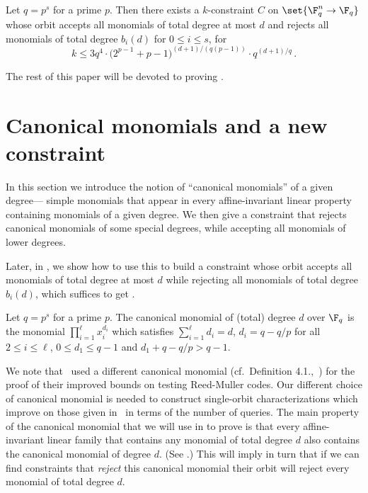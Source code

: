 \begin{theorem}\label{thm:main2}
Let $q=p^s$ for a prime $p$.
Then there exists a $k$-constraint $C$ on $\set{\F_q^n \to \F_q}$ whose orbit
accepts all monomials
of total degree at most $d$
and rejects all
monomials of total degree $b_i(d)$ for $0 \leq i \leq s$,
for \[k \leq 3q^4 \cdot \big(2^{p-1}+p-1\big)^{(d+1)/(q(p-1))} \cdot q^{(d+1)/q}\,.\]
\end{theorem}

The rest of this paper will be devoted to proving .


\section{Canonical monomials and a new constraint}
\label{sec:main}

In this section we introduce the notion of ``canonical monomials''
of a given degree---%
simple %
monomials that appear in every affine-invariant
linear property containing monomials of a given degree.
We then give a constraint that rejects canonical monomials of
some special degrees, while accepting all monomials of lower degrees.

Later, in , we show how to use this to build
a constraint whose orbit accepts all monomials of total degree at most $d$ while rejecting
all monomials of total degree $b_i(d)$, which suffices to get .

\begin{definition}\label{defn:canonical-monomial}
Let $q=p^s$ for a prime $p$. The canonical monomial of (total) degree $d$ over $\F_q$ is the monomial $\prod_{i=1}^{\ell} x_i^{d_i} $
which satisfies $\sum_{i=1}^{\ell} d_i = d$,
$d_i = q-q/p$ for all $2 \leq i \leq \ell$,  $0 \leq d_1 \leq q-1$ and  $d_1 + q-q/p > q -1$.
\end{definition}

We note that~\cite{HSS11} used a different canonical monomial (cf.\ Definition 4.1.,~\cite{HSS11}) for the proof of their improved bounds on testing Reed-Muller codes.
Our different choice of canonical monomial is needed to construct single-orbit characterizations which improve on those given in~\cite{HSS11}
in terms of the number of queries.
The main property of the canonical monomial that we will use in
to prove  is that
every affine-invariant linear family that contains any monomial
of total degree $d$ also contains the canonical monomial of degree $d$.
(See .) 
This will imply in turn that if we can find constraints
that \emph{reject} this canonical monomial their orbit will reject every monomial
of total degree $d$.


